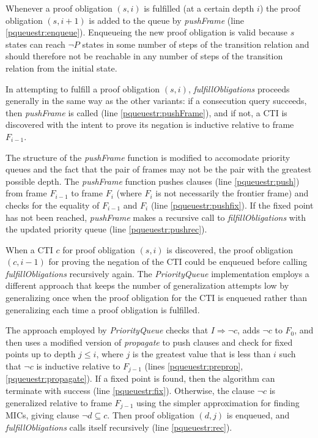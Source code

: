 \documentclass[12pt,a4paper,twoside,openright]{report}
\begin{document}
{{Whenever a proof obligation $(s,i)$ is fulfilled (at a certain depth $i$) the proof obligation
$(s, i + 1)$ is added to the queue by {\it pushFrame} (line \ref{pqueuestr:enqueue}).
Enqueueing the new proof obligation is valid
because $s$ states can reach $\neg P$ states in some
number of steps of the transition relation and should therefore
not be reachable in any number of steps of the transition relation from the initial state.

In attempting to fulfill a proof obligation $(s,i)$, {\it fulfillObligations} proceeds
generally in the same way as the other variants: if a consecution query succeeds,
then {\it pushFrame} is called (line \ref{pqueuestr:pushFrame}), and if not, a CTI is discovered with the intent
to prove its negation is inductive relative to frame $F_{i - 1}$.

The structure of the {\it pushFrame} function is modified to
accomodate priority queues
and the fact that the pair of frames may not be the pair with the greatest possible depth.
The {\it pushFrame} function pushes clauses (line \ref{pqueuestr:push})
from frame $F_{i - 1}$ to frame $F_i$ (where
$F_i$ is not necessarily the frontier frame) and checks
for the equality of $F_{i - 1}$ and $F_i$ (line \ref{pqueuestr:pushfix}). If the fixed point has not been
reached, {\it pushFrame} makes a recursive call to {\it filfillObligations} with the updated
priority queue (line \ref{pqueuestr:pushrec}).

When a CTI $c$ for proof obligation $(s,i)$ is discovered, the proof obligation $(c,i - 1)$
for proving the negation of the CTI could be enqueued before
calling {\it fulfillObligations} recursively again.
The \emph{PriorityQueue} implementation employs a different approach that keeps the number of
generalization attempts low by generalizing once when the proof obligation
for the CTI is enqueued rather than generalizing each time a proof obligation
is fulfilled.

The approach employed by \emph{PriorityQueue} checks
that $I \Rightarrow \neg c$, adds $\neg c$ to $F_0$, and then uses a modified
version of {\it propagate} to push clauses and check for fixed points up to
depth $j \leq i$, where $j$ is the greatest value that is less than $i$
such that $\neg c$ is inductive relative to $F_{j - 1}$
(lines \ref{pqueuestr:preprop}, \ref{pqueuestr:propagate}). If a fixed point is
found, then the algorithm can terminate with success (line \ref{pqueuestr:fix}). Otherwise, the clause
$\neg c$ is generalized relative to frame $F_{j - 1}$
using the simpler approximation for finding MICs, giving clause
$\neg d \subseteq c$. Then proof obligation $(d,j)$ is enqueued, and
{\it fulfillObligations} calls itself recursively (line \ref{pqueuestr:rec}).

}}
\end{document}
